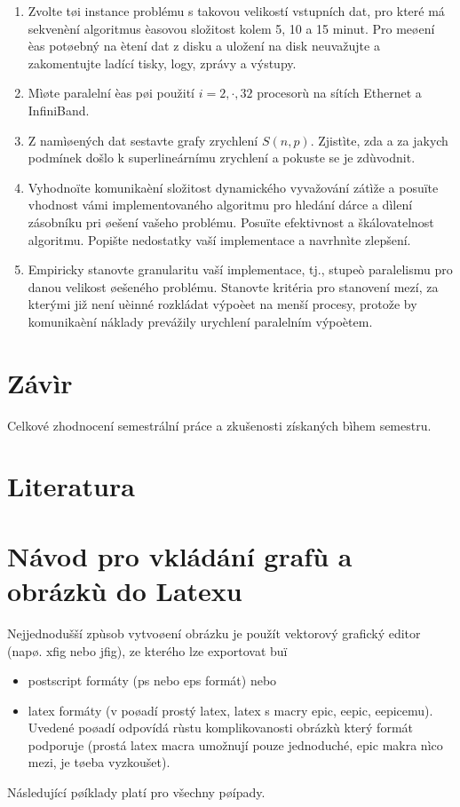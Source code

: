 \documentclass[12pt]{article}
\begin{document}
\begin{enumerate}
\item Zvolte tøi instance problému s takovou velikostí vstupních dat, pro které má
sekvenèní algoritmus èasovou složitost kolem 5, 10 a 15 minut. Pro
meøení èas potøebný na ètení dat z disku a uložení na disk
neuvažujte a zakomentujte ladící tisky, logy, zprávy a výstupy.
\item Mìøte paralelní èas pøi použití $i=2,\cdot,32$ procesorù na sítích Ethernet a InfiniBand.
\item Z namìøených dat sestavte grafy zrychlení $S(n,p)$. Zjistìte, zda a za jakych podmínek
došlo k superlineárnímu zrychlení a pokuste se je zdùvodnit.
\item Vyhodnoïte komunikaèní složitost dynamického vyvažování zátìže a posuïte
vhodnost vámi implementovaného algoritmu pro hledání dárce a dìlení
zásobníku pri øešení vašeho problému. Posuïte efektivnost a
škálovatelnost algoritmu. Popište nedostatky vaší implementace a
navrhnìte zlepšení.
\item Empiricky stanovte
granularitu vaší implementace, tj., stupeò paralelismu pro danou
velikost øešeného problému. Stanovte kritéria pro stanovení mezí, za
kterými již není uèinné rozkládat výpoèet na menší procesy, protože
by komunikaèní náklady prevážily urychlení paralelním výpoètem.

\end{enumerate}

\section{Závìr}

Celkové zhodnocení semestrální práce a zkušenosti získaných bìhem
semestru.

\section{Literatura}

\appendix

\section{Návod pro vkládání grafù a obrázkù do Latexu}

Nejjednodušší zpùsob vytvoøení obrázku je použít vektorový grafický
editor (napø. xfig nebo jfig), ze kterého lze exportovat buï
\begin{itemize}
\item postscript formáty (ps nebo eps formát) nebo
\item latex formáty (v poøadí prostý latex, latex s macry epic, eepic, eepicemu). Uvedené poøadí odpovídá rùstu
komplikovanosti obrázkù který formát podporuje (prostá latex macra
umožnují pouze jednoduché, epic makra nìco mezi, je tøeba
vyzkoušet).

\end{itemize}
Následující pøíklady platí pro všechny pøípady.
\end{document}
